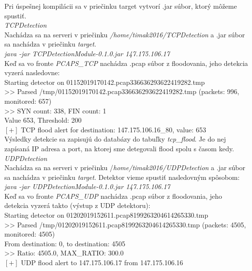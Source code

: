 \documentclass[a4paper,12pt]{article}
\begin{document}
Pri úspešnej kompilácii sa v priečinku target vytvorí .jar súbor, ktorý môžeme spustiť. \\

\noindent \textit{TCPDetection} \\

Nachádza sa na serveri v priečinku \textit{/home/timak2016/TCPDetection} a .jar súbor sa nachádza v priečinku \textit{target}. \\

\noindent \textit{java -jar TCPDetectionModule-0.1.0.jar 147.175.106.17} \\

Keď sa vo fronte \textit{PCAPS\_TCP} nachádza .pcap súbor z floodovania, jeho detekcia vyzerá nasledovne: \\

\noindent [TCPDetection] Starting detector on 01152019170142.pcap336636293622419282.tmp \\
>> Parsed /tmp/01152019170142.pcap336636293622419282.tmp (packets: 996, monitored: 657) \\
>> SYN count: 338, FIN count: 1 \\
Value 653, Threshold: 200 \\
$[+]$ TCP flood alert for destination: 147.175.106.16\_80, value: 653 \\

Výsledky detekcie sa zapisujú do databázy do tabuľky \textit{tcp\_flood}. Je do nej zapísaná IP adresa a port, na ktorej sme detegovali flood spolu s časom kedy. \\

\noindent \textit{UDPDetection} \\

Nachádza sa na serveri v priečinku /\textit{home/timak2016/UDPDetection} a .jar súbor sa nachádza v priečinku \textit{target}. Detektor vieme spustiť nasledovným spôsobom: \\

\noindent \textit{java -jar UDPDetectionModule-0.1.0.jar 147.175.106.17} \\

Keď sa vo fronte \textit{PCAPS\_UDP} nachádza .pcap súbor z floodovania, jeho detekcia vyzerá takto (výstup z UDP detektoru): \\

\noindent [UDPDetection] Starting detector on 01202019152611.pcap8199263204614265330.tmp \\
>> Parsed /tmp/01202019152611.pcap8199263204614265330.tmp (packets: 4505, monitored: 4505) \\
From destination: 0, to destination: 4505 \\
>> Ratio: 4505.0, MAX\_RATIO: 300.0 \\
$[+]$ UDP flood alert to 147.175.106.17 from 147.175.106.16 \\
\end{document}
